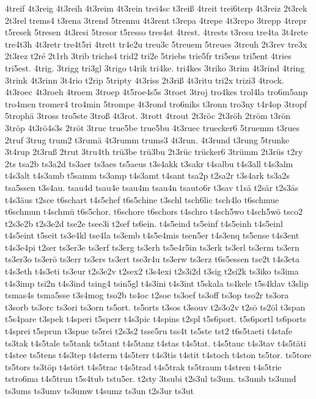 {4treif
4t3reig
4t3reih
4t3reim
4t3rein
trei4sc
t3reiß
4treit
trei6terp
4t3reiz
2t3rek
2t3rel
trems4
t3rena
3trend
5trennu
4t3rent
t3repa
4trepe
4t3repo
3trepp
4trepr
t5resek
5tresen
4t3resi
5tresor
t5resso
tres4st
4trest.
4trests
t3resu
tre4ta
3t4rete
tre4t3h
4t3retr
tre4t5ri
4trett
tr4e2u
treu3c
5treuem
5treues
3treuh
2t3rev
tre3x
2t3rez
t2ré
2t1rh
3trib
trichs4
trid2
tri2e
5triebs
trie5fr
tri5ens
tri5ent
4tries
tri5est.
4trig.
3trigg
tri3gl
3trigo
t4rik
tri4ke.
tri4kes
3triko
3trim
4t3rind
4tring
3trink
4t3rinn
3t4rio
t2rip
5tripty
4t3riss
2t3riß
4t3ritu
tri2x
trizi3
4trock.
4t3roec
4t3roeh
4troem
3troep
4t5roe4s5s
3troet
3troj
tro4kes
trol4la
tro6m5anp
tro4men
tromer4
tro4min
5trompe
4t3rond
tro6niks
t3ronn
tro3ny
t4r4op
3tropf
5trophä
3tross
tro5ste
3troß
4t3rot.
3trott
4trout
2t3röc
2t3röh
2tröm
t3rön
3tröp
4t3rö4s3s
2tröt
3truc
true5be
true5bu
4t3ruec
truecker6
5truemm
t3rues
2truf
3trug
trum2
t3rumä
4t3rumm
trums3
4t3run.
4t3rund
t3rung
5trunke
3t4rup
2t3ruß
2trut
3tru4th
trü3be
trü3bu
2t3rüc
trücker6
3trümm
2t3rüs
t2ry
2ts
tsa2b
ts3a2d
ts3aer
ts3aes
ts5aeus
t3s4akk
t3sakr
t4salbu
t4s3all
t4s3alm
t4s3alt
t4s3amb
t5samm
ts3amp
t4s3amt
t4sant
tsa2p
t2sa2r
t3s4ark
ts3a2s
tsa5ssen
t3s4au.
tsau4d
tsau4e
tsau4m
tsau4n
tsauto6r
t3sav
t1sä
t2sär
t2s3äs
t4s3äus
t2sce
t6schart
t4s5chef
t6s5chine
t3schl
tsch6lic
tsch4lo
t6schmue
t6schmun
t4schmü
t6s5chor.
t6schore
t6schors
t4schro
t4sch5wo
t4sch5wö
tsco2
t2s3e2b
t2s3e2d
tse2e
tsee3i
t2sef
ts6ein.
t4s5eind
ts5einf
t4s5einh
t4s5einl
t4s5eint
t5seit
ts3e4kl
tse4la
ts3emb
t4s5e4mis
tsen5er
t4s3enq
ts5ense
t4s3ent
t4s3e4pi
t2ser
ts3er3e
ts3erf
ts3erg
ts3erh
ts5e4r5in
ts3erk
ts3erl
ts3erm
ts3ern
ts3er3o
ts3erö
ts3err
ts3ers
ts3ert
tse3r4u
ts3erw
ts3erz
t6s5essen
tse2t
t4s3eta
t4s3eth
t4s3eti
ts3eur
t2s3e2v
t2sex2
t3s4exi
t2s3i2d
t3sig
t2si2k
ts3iko
ts3ima
t4s3imp
tsi2n
t4s3ind
tsing4
tsin5gl
t4s3ini
t4s3int
t5skala
ts4kele
t5s4klav
t3slip
tsmas4s
tsma5sse
t3s4mog
tso2b
ts4oc
t2soe
ts3oef
ts3off
ts3op
tso2r
ts3ora
t3sorb
ts3orc
ts3ori
ts3orn
ts5ort.
ts5orts
t3sos
t3souv
t2s3o2v
t2sö
ts2öl
t3span
t5s4pare
t3spek
t4speri
t5sperr
t4s3pic
t4spins
t2spl
t5s6port.
t5s6portl
ts6ports
t4sprei
t5sprun
t3spue
ts5rei
t2s3s2
tsse5ru
tss4t
ts5ste
tst2
t6s5taeti
t4stafe
ts3tak
t4s5tale
ts5tank
ts5tant
t4s5tanz
t4stas
t4s5tat.
t4s5tauc
t4s3tav
t4s5täti
t4stee
ts5tens
t4s3tep
t4sterm
t4s5terr
t4s3tis
t4stit
t4stoch
t4ston
ts5tor.
ts5tore
ts5tors
ts3töp
t4stört
t4s5trac
t4s5trad
t4s5trak
ts5traum
t4stren
t4s5trie
tstro6ma
t4s5trun
t5s4tub
tstu5er.
t2sty
3tsubi
t2s3ul
ts3um.
ts3umb
ts3umd
ts3ums
ts3umv
ts3umw
t4sumz
ts3un
t2s3ur
ts3ut
}
